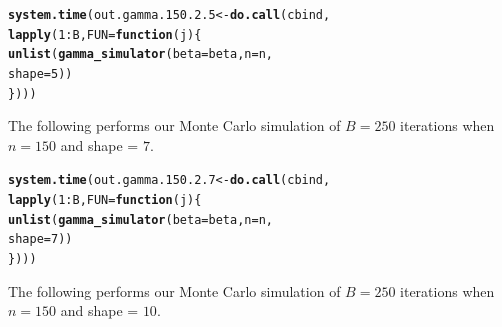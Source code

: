 \documentclass[11pt]{article}\usepackage[]{graphicx}\usepackage[]{color}
\makeatletter
\newcommand{\hlnum}[1]{\textcolor[rgb]{0.686,0.059,0.569}{#1}}%
\newcommand{\hlopt}[1]{\textcolor[rgb]{0,0,0}{#1}}%
\newcommand{\hlstd}[1]{\textcolor[rgb]{0.345,0.345,0.345}{#1}}%
\newcommand{\hlkwa}[1]{\textcolor[rgb]{0.161,0.373,0.58}{\textbf{#1}}}%
\newcommand{\hlkwb}[1]{\textcolor[rgb]{0.69,0.353,0.396}{#1}}%
\newcommand{\hlkwc}[1]{\textcolor[rgb]{0.333,0.667,0.333}{#1}}%
\newcommand{\hlkwd}[1]{\textcolor[rgb]{0.737,0.353,0.396}{\textbf{#1}}}%
\newenvironment{kframe}{%
 \def\at@end@of@kframe{}%
 \ifinner\ifhmode%
  \def\at@end@of@kframe{\end{minipage}}%
  \begin{minipage}{\columnwidth}%
 \fi\fi%
 \def\FrameCommand##1{\hskip\@totalleftmargin \hskip-\fboxsep
 \colorbox{shadecolor}{##1}\hskip-\fboxsep
     \hskip-\linewidth \hskip-\@totalleftmargin \hskip\columnwidth}%
 \MakeFramed {\advance\hsize-\width
   \@totalleftmargin\z@ \linewidth\hsize
   \@setminipage}}%
 {\par\unskip\endMakeFramed%
 \at@end@of@kframe}
\newenvironment{knitrout}{}{} %
\makeatother
\begin{document}
\begin{knitrout}
\color{fgcolor}\begin{kframe}
\begin{alltt}
\hlkwd{system.time}\hlstd{(out.gamma.150.2.5} \hlkwb{<-} \hlkwd{do.call}\hlstd{(cbind,}
  \hlkwd{lapply}\hlstd{(}\hlnum{1}\hlopt{:}\hlstd{B,} \hlkwc{FUN} \hlstd{=} \hlkwa{function}\hlstd{(}\hlkwc{j}\hlstd{)\{}
    \hlkwd{unlist}\hlstd{(}\hlkwd{gamma_simulator}\hlstd{(}\hlkwc{beta} \hlstd{= beta,} \hlkwc{n} \hlstd{= n,}
      \hlkwc{shape} \hlstd{=} \hlnum{5}\hlstd{))}
\hlstd{\})))}
\end{alltt}


{\ttfamily\noindent\bfseries\color{errorcolor}{\#\# Error in r[, l]/mad.predict.fun(out.mad, xx): non-numeric argument to binary operator}}

{\ttfamily\noindent\itshape\color{messagecolor}{\#\# Timing stopped at: 1.55 0.001 1.55}}\end{kframe}
\end{knitrout}


The following performs our Monte Carlo simulation of $B = 250$ iterations 
when $n = 150$ and shape = $7$.

\begin{knitrout}
\color{fgcolor}\begin{kframe}
\begin{alltt}
\hlkwd{system.time}\hlstd{(out.gamma.150.2.7} \hlkwb{<-} \hlkwd{do.call}\hlstd{(cbind,}
  \hlkwd{lapply}\hlstd{(}\hlnum{1}\hlopt{:}\hlstd{B,} \hlkwc{FUN} \hlstd{=} \hlkwa{function}\hlstd{(}\hlkwc{j}\hlstd{)\{}
    \hlkwd{unlist}\hlstd{(}\hlkwd{gamma_simulator}\hlstd{(}\hlkwc{beta} \hlstd{= beta,} \hlkwc{n} \hlstd{= n,}
      \hlkwc{shape} \hlstd{=} \hlnum{7}\hlstd{))}
\hlstd{\})))}
\end{alltt}


{\ttfamily\noindent\bfseries\color{errorcolor}{\#\# Error in r[, l]/mad.predict.fun(out.mad, xx): non-numeric argument to binary operator}}

{\ttfamily\noindent\itshape\color{messagecolor}{\#\# Timing stopped at: 1.49 0 1.49}}\end{kframe}
\end{knitrout}


The following performs our Monte Carlo simulation of $B = 250$ iterations 
when $n = 150$ and shape = $10$.
\end{document}
